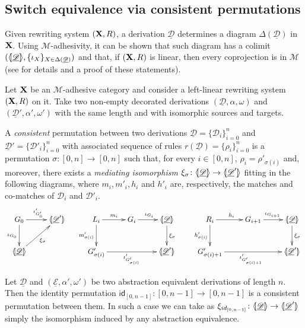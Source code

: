 \documentclass[a4paper,UKenglish,cleveref,pdftex,thm-restate,numberwithinsect]{lipics-v2021}
\newcommand{\id}[1]{\mathsf{id}_{#1}}
\def\R{\mathsf{R}}
\def\X{\textbf {\textup{X}}}
\newcommand{\dder}[1]{\mathscr{#1}}
\newcommand{\der}[1]{\underline{\dder{#1}}}
\newcommand{\lpro}{\langle \hspace{-1.85pt}[}
\newcommand{\rpro}{]\hspace{-1.85pt}\rangle}
\newcommand{\tpro}[1]{\lpro \der{#1}\rpro}
\begin{document}
\iffalse 
\subsection{Switch equivalence via consistent permutations} \label{subsec:perm}


Given rewriting system $(\X, \R)$,  a derivation $\der{D}$ determines a diagram
$\Delta(\der{D})$ in $\X$. Using $\mathcal{M}$-adhesivity, it can be shown that such diagram 
has a colimit $(\tpro{D}, \{\iota_X\}_{X\in \Delta(\der{D})})$ and that, if $(\X, \R)$ is linear,
then every coprojection is in $\mathcal{M}$ (see  for details and a proof of these statements).

\begin{definition}
	\label{def:permcon}
	Let $\X$ be an $\mathcal{M}$-adhesive category and consider a
	left-linear rewriting system $(\X, \R)$ on it.  Take two
	non-empty decorated derivations $(\der{D}, \alpha, \omega)$ and
	$(\der{D}', \alpha', \omega')$ with the same length and with
	isomorphic sources and targets.
	
	A \emph{consistent} permutation between two derivations $\der{D}=\{\dder{D}_i\}_{i=0}^n$ and
	$\der{D}'=\{\dder{D}'_i\}_{i=0}^n$ with associated sequence of rules
	$r(\der{D})=\{\rho_i\}_{i=0}^n$ is a permutation
	$\sigma\colon [0,n]\to [0,n]$ such that, for every $i\in [0,n]$,
	$\rho_i=\rho'_{\sigma(i)}$ and, moreover, there exists a
	\emph{mediating isomorphism}
	$\xi_\sigma\colon \tpro{D} \to \lpro \der{D}' \rpro$ fitting in the
	following diagrams, where $m_i, m'_i, h_i$ and $h'_i$ are,
	respectively, the matches and co-matches of $\dder{D}_i$ and
	$\dder{D}'_i$.
	\[
	\xymatrix{
		G_0 \ar[r]^{\iota'_{G'_0}} \ar[d]_{\iota_{G_0}}& \lpro \der{D}' \rpro &L_i\ar[r]^{m_i} \ar[d]_{m'_{\sigma(i)}}& G_i \ar[r]^{\iota_{G_i}}
		&\tpro{D} \ar[d]^{\xi_\sigma} & R_i \ar[r]^{h_i}
		\ar[d]_{h'_{\sigma(i)}}& G_{i+1} \ar[r]^{\iota_{G_{i+1}}}
		&\tpro{D} \ar[d]^{\xi_\sigma} \\\tpro{D} \ar[ur]_{\xi_\sigma}&&G'_{\sigma(i)}
		\ar[rr]_{\iota'_{G'_{\sigma(i)}}}&& \lpro \der{D}' \rpro&
		G'_{\sigma(i)+1} \ar[rr]_{\iota'_{G'_{\sigma(i)+1}}}&& \lpro
		\der{D}' \rpro}
	\]
\end{definition}


\begin{remark}\label{rem:abs}
	Let $\der{D}$ and $(\der{E}, \alpha', \omega')$ be two abstraction equivalent derivations of length $n$. Then the identity permutation $\id{[0,n-1]}\colon [0,n-1]\to [0,n-1]$ is a consistent permutation between them. In such a case we can take as $\xi_{\id{[0,n-1]}}\colon \tpro{D}\to \lpro \der{D}'\rpro$ simply the isomorphism induced by any abstraction equivalence.
\end{remark}
\end{document}
